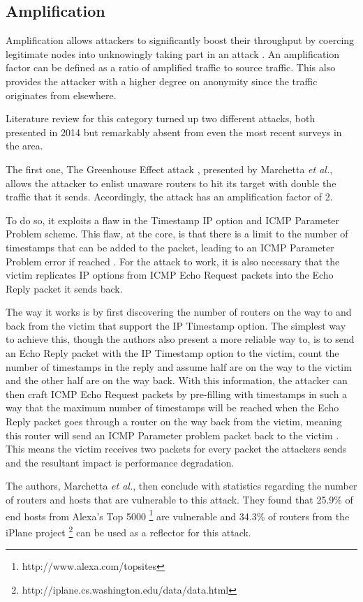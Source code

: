 \documentclass[conference]{IEEEtran}
\begin{document}
\subsection{Amplification}
Amplification allows attackers to significantly boost their throughput by coercing legitimate nodes into unknowingly taking part in an attack \cite{Krupp:Scan}. An amplification factor can be defined as a ratio of amplified traffic to source traffic. This also provides the attacker with a higher degree on anonymity since the traffic originates from elsewhere.

Literature review for this category turned up two different attacks, both presented in 2014 but remarkably absent from even the most recent surveys in the area.

The first one, The Greenhouse Effect attack \cite{GreenhouseEffect:Marchetta}, presented by Marchetta \textit{et al.}, allows the attacker to enlist unaware routers to hit its target with double the traffic that it sends. Accordingly, the attack has an amplification factor of 2.

To do so, it exploits a flaw in the Timestamp IP option and ICMP Parameter Problem scheme. This flaw, at the core, is that there is a limit to the number of timestamps that can be added to the packet, leading to an ICMP Parameter Problem error if reached \cite{GreenhouseEffect:Marchetta}. For the attack to work, it is also necessary that the victim replicates IP options from ICMP Echo Request packets into the Echo Reply packet it sends back.

The way it works is by first discovering the number of routers on the way to and back from the victim that support the IP Timestamp option. The simplest way to achieve this, though the authors also present a more reliable way to, is to send an Echo Reply packet with the IP Timestamp option to the victim, count the number of timestamps in the reply and assume half are on the way to the victim and the other half are on the way back. With this information, the attacker can then craft ICMP Echo Request packets by pre-filling with timestamps in such a way that the maximum number of timestamps will be reached when the Echo Reply packet goes through a router on the way back from the victim, meaning this router will send an ICMP Parameter problem packet back to the victim \cite{GreenhouseEffect:Marchetta}. This means the victim receives two packets for every packet the attackers sends and the resultant impact is performance degradation.

The authors, Marchetta \textit{et al.}, then conclude with statistics regarding the number of routers and hosts that are vulnerable to this attack. They found that 25.9\% of end hosts from Alexa's Top 5000 \footnote{http://www.alexa.com/topsites} are vulnerable and 34.3\% of routers from the iPlane project \footnote{http://iplane.cs.washington.edu/data/data.html} can be used as a reflector for this attack.
\end{document}
